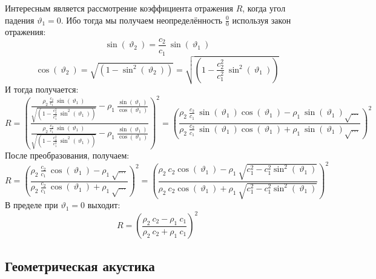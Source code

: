 \documentclass[14pt,a4paper,oneside]{extarticle}	%
\newcommand{\bracket}[1] {\left( #1 \right) } %
\begin{document}
Интересным является рассмотрение коэффициента отражения $ R $, когда угол падения  $ \vartheta_{1} = 0 $.
Ибо тогда мы получаем неопределённость $ \frac{0}{0} $ используя закон отражения:
\begin{equation*}
\sin(\: \vartheta_{2}\:) = \frac{c_{2}}{c_{1}}\:\sin(\: \vartheta_{1}\:)
\end{equation*}
\begin{equation*}
\cos(\: \vartheta_{2}\:) = \sqrt{\bracket{1 - \sin^{2}(\: \vartheta_{2}\:) }} = \sqrt{\bracket{1 - \frac{c_{2}^{2}}{c_{1}^{2}}\:\sin^{2}(\: \vartheta_{1}\:) }}
\end{equation*}
И тогда получается:
\begin{equation*}
R = \bracket{\frac{\frac{\rho_{2}\:\frac{c_{2}}{c_{1}}\:\sin(\: \vartheta_{1}\:)}{\sqrt{\bracket{1 - \frac{c_{2}^{2}}{c_{1}^{2}}\:\sin^{2}(\: \vartheta_{1}\:) }}} - \rho_{1}\:\frac{\sin(\:\vartheta_{1}\:)}{\cos(\:\vartheta_{1}\:)}}{\frac{\rho_{2}\:\frac{c_{2}}{c_{1}}\:\sin(\: \vartheta_{1}\:)}{\sqrt{\bracket{1 - \frac{c_{2}^{2}}{c_{1}^{2}}\:\sin^{2}(\: \vartheta_{1}\:) }}} - \rho_{1}\:\frac{\sin(\:\vartheta_{1}\:)}{\cos(\:\vartheta_{1}\:)}}}^{2} = \bracket{\frac{\rho_{2}\:\frac{c_{2}}{c_{1}}\:\sin(\: \vartheta_{1}\:)\cos(\: \vartheta_{1}\:) - \rho_{1}\:\sin(\: \vartheta_{1}\:)\sqrt{...}}{\rho_{2}\:\frac{c_{2}}{c_{1}}\:\sin(\: \vartheta_{1}\:)\cos(\: \vartheta_{1}\:) + \rho_{1}\:\sin(\: \vartheta_{1}\:)\sqrt{...}}}^{2}
\end{equation*}
После преобразования, получаем:
\begin{equation*}
R = \bracket{\frac{\rho_{2}\:\frac{c_{2}}{c_{1}}\:\cos(\: \vartheta_{1}\:) - \rho_{1}\:\sqrt{...}}{\rho_{2}\:\frac{c_{2}}{c_{1}}\:\cos(\: \vartheta_{1}\:) + \rho_{1}\:\sqrt{...}}}^{2}  =\bracket{\frac{\rho_{2}\:c_{2}\cos(\:\vartheta_{1}\:) - \rho_{1}\:\sqrt{c^{2}_{1}-c^{2}_{1}\sin^{2}(\: \vartheta_{1}\:) }}{\rho_{2}\:c_{2}\cos(\:\vartheta_{1}\:) + \rho_{1}\:\sqrt{c^{2}_{1}-c^{2}_{1}\sin^{2}(\: \vartheta_{1}\:) }}}^{2} 
\end{equation*}
В пределе при $ \vartheta_{1} = 0 $ выходит:
\begin{equation*}
R =\bracket{\frac{\rho_{2}\:c_{2} - \rho_{1}\:c_{1}}{\rho_{2}\:c_{2} + \rho_{1}\:c_{1}}}^{2} 
\end{equation*}
\newpage
\begin{center}
	\subsection*{Геометрическая акустика} %
\end{center}
\end{document}
